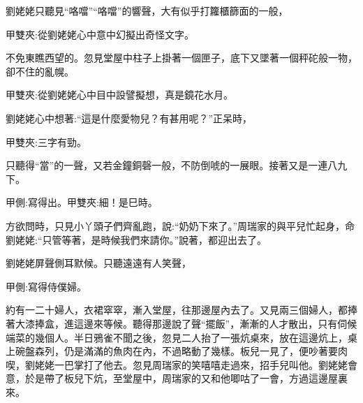\begin{parag}
    劉姥姥只聽見“咯噹”“咯噹”的響聲，大有似乎打籮櫃篩面的一般，\begin{note}甲雙夾:從劉姥姥心中意中幻擬出奇怪文字。\end{note}不免東瞧西望的。忽見堂屋中柱子上掛著一個匣子，底下又墜著一個秤砣般一物，卻不住的亂幌。\begin{note}甲雙夾:從劉姥姥心中目中設譬擬想，真是鏡花水月。\end{note}劉姥姥心中想著:“這是什麼愛物兒？有甚用呢？”正呆時，\begin{note}甲雙夾:三字有勁。\end{note}只聽得“當”的一聲，又若金鐘銅磬一般，不防倒唬的一展眼。接著又是一連八九下。\begin{note}甲側:寫得出。甲雙夾:細！是巳時。\end{note}方欲問時，只見小丫頭子們齊亂跑，說:“奶奶下來了。”周瑞家的與平兒忙起身，命劉姥姥:“只管等著，是時候我們來請你。”說著，都迎出去了。
\end{parag}


\begin{parag}
    劉姥姥屏聲側耳默候。只聽遠遠有人笑聲，\begin{note}甲側:寫得侍僕婦。\end{note}約有一二十婦人，衣裙窣窣，漸入堂屋，往那邊屋內去了。又見兩三個婦人，都捧著大漆捧盒，進這邊來等候。聽得那邊說了聲“擺飯”，漸漸的人才散出，只有伺候端菜的幾個人。半日鴉雀不聞之後，忽見二人抬了一張炕桌來，放在這邊炕上，桌上碗盤森列，仍是滿滿的魚肉在內，不過略動了幾樣。板兒一見了，便吵著要肉喫，劉姥姥一巴掌打了他去。忽見周瑞家的笑嘻嘻走過來，招手兒叫他。劉姥姥會意，於是帶了板兒下炕，至堂屋中，周瑞家的又和他唧咕了一會，方過這邊屋裏來。
\end{parag}


